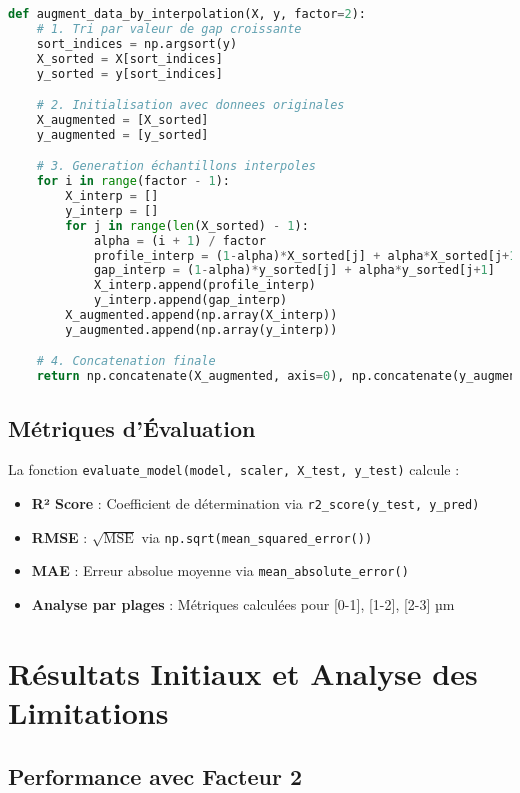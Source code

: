 \documentclass[11pt,a4paper,twocolumn]{article}
\begin{document}
\begin{lstlisting}[language=Python, basicstyle=\tiny]
def augment_data_by_interpolation(X, y, factor=2):
    # 1. Tri par valeur de gap croissante
    sort_indices = np.argsort(y)
    X_sorted = X[sort_indices]
    y_sorted = y[sort_indices]

    # 2. Initialisation avec donnees originales
    X_augmented = [X_sorted]
    y_augmented = [y_sorted]

    # 3. Generation échantillons interpoles
    for i in range(factor - 1):
        X_interp = []
        y_interp = []
        for j in range(len(X_sorted) - 1):
            alpha = (i + 1) / factor
            profile_interp = (1-alpha)*X_sorted[j] + alpha*X_sorted[j+1]
            gap_interp = (1-alpha)*y_sorted[j] + alpha*y_sorted[j+1]
            X_interp.append(profile_interp)
            y_interp.append(gap_interp)
        X_augmented.append(np.array(X_interp))
        y_augmented.append(np.array(y_interp))

    # 4. Concatenation finale
    return np.concatenate(X_augmented, axis=0), np.concatenate(y_augmented)
\end{lstlisting}

\subsection{Métriques d'Évaluation}

La fonction \texttt{evaluate\_model(model, scaler, X\_test, y\_test)} calcule :
\begin{itemize}
    \item \textbf{R² Score} : Coefficient de détermination via \texttt{r2\_score(y\_test, y\_pred)}
    \item \textbf{RMSE} : $\sqrt{\text{MSE}}$ via \texttt{np.sqrt(mean\_squared\_error())}
    \item \textbf{MAE} : Erreur absolue moyenne via \texttt{mean\_absolute\_error()}
    \item \textbf{Analyse par plages} : Métriques calculées pour [0-1], [1-2], [2-3] µm
\end{itemize}

\section{Résultats Initiaux et Analyse des Limitations}

\subsection{Performance avec Facteur 2}
\end{document}
